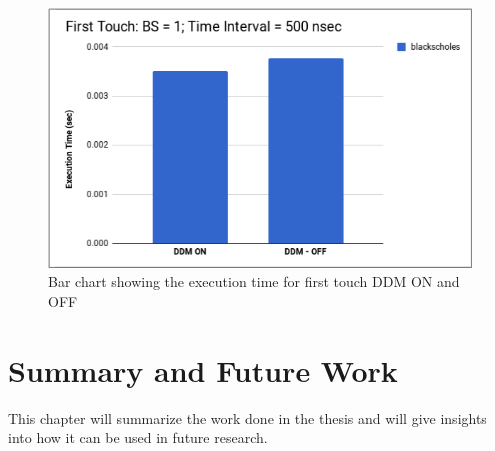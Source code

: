 \documentclass{listhesis}
\begin{document}
\begin{figure}
  \includegraphics[width=\linewidth]{FT_DDM_ON_OFF_BLACK.png}
  \centering
  \caption{Bar chart showing the execution time for first touch DDM ON and OFF}
  \label{fig:FT_DDM_ON_OFF_BLACK.png}
\end{figure}

\chapter{Summary and Future Work}
This chapter will summarize the work done in the thesis and will give insights into how it can be used in future research. 
\end{document}
